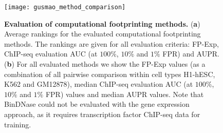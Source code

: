 \begin{figure}[h!]
\centering
\texttt{[image: gusmao\_method\_comparison]}
\caption[Evaluation of computational footprinting methods]{\textbf{Evaluation of computational footprinting methods.} (\textbf{a}) Average rankings for the evaluated computational footprinting methods. The rankings are given for all evaluation criteria: FP-Exp, ChIP-seq evaluation AUC (at $100\%$, $10\%$ and $1\%$ FPR) and AUPR. (\textbf{b}) For all evaluated methods we show the FP-Exp values (as a combination of all pairwise comparison within cell types H1-hESC, K562 and GM12878), median ChIP-seq evaluation AUC (at $100\%$, $10\%$ and $1\%$ FPR) values and median AUPR values. Note that BinDNase could not be evaluated with the gene expression approach, as it requires transcription factor ChIP-seq data for training.}
\label{fig:gusmao_method_comparison}
\end{figure}

